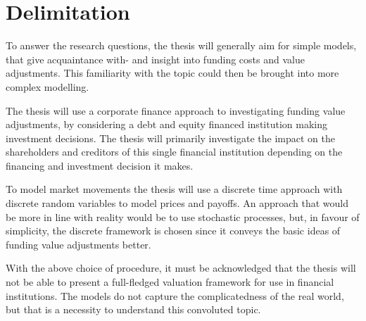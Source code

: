 \documentclass[main.tex]{subfiles}
\begin{document}
    \section{Delimitation}

    To answer the research questions, the thesis will generally aim for simple models,
    that give acquaintance with- and insight into funding costs and value adjustments.
    This familiarity with the topic could then be brought into more complex modelling.

    The thesis will use a corporate finance approach to investigating funding value adjustments,
    by considering a debt and equity financed institution making investment decisions.
    The thesis will primarily investigate the impact on the shareholders and creditors 
    of this single financial institution depending on the financing and investment decision it makes.

    To model market movements the thesis will use a discrete time approach 
    with discrete random variables to model prices and payoffs.
    An approach that would be more in line with reality would be to use stochastic processes,
    but, in favour of simplicity, the discrete framework is chosen 
    since it conveys the basic ideas of funding value adjustments better.

    With the above choice of procedure, it must be acknowledged that the thesis will not be able to
    present a full-fledged valuation framework for use in financial institutions.
    The models do not capture the complicatedness of the real world,
    but that is a necessity to understand this convoluted topic.
\end{document}
